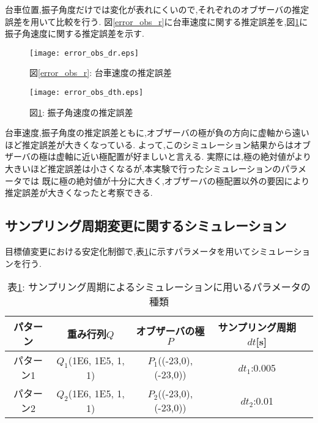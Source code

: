 台車位置,振子角度だけでは変化が表れにくいので,それぞれのオブザーバの推定誤差を用いて比較を行う.
図\ref{error_obs_r}に台車速度に関する推定誤差を,図\ref{error_obs_th}に振子角速度に関する推定誤差を示す.

\begin{figure}[htbp]
    \begin{minipage}{0.5\hsize}
        \begin{center}
            \texttt{[image: error\_obs\_dr.eps]}
            \caption{図\ref{error_obs_r}: 台車速度の推定誤差}
            \label{error_obs_r}
        \end{center}
    \end{minipage}
    \begin{minipage}{0.5\hsize}
        \begin{center}
            \texttt{[image: error\_obs\_dth.eps]}
            \caption{図\ref{error_obs_th}: 振子角速度の推定誤差}
            \label{error_obs_th}
        \end{center}
    \end{minipage}
\end{figure}

台車速度,振子角度の推定誤差ともに,オブザーバの極が負の方向に虚軸から遠いほど推定誤差が大きくなっている.
よって,このシミュレーション結果からはオブザーバの極は虚軸に近い極配置が好ましいと言える.
実際には,極の絶対値がより大きいほど推定誤差は小さくなるが,本実験で行ったシミュレーションのパラメータでは
既に極の絶対値が十分に大きく,オブザーバの極配置以外の要因により推定誤差が大きくなったと考察できる.


\subsection{サンプリング周期変更に関するシミュレーション}
目標値変更における安定化制御で,表\ref{sim_Dt}に示すパラメータを用いてシミュレーションを行う.

\begin{table}[htbp]
    \begin{center}
        \caption{表\ref{sim_Dt}: サンプリング周期によるシミュレーションに用いるパラメータの種類}
        \begin{tabular}{|c|c|c|c|c|} \hline
            パターン & 重み行列$Q$ & オブザーバの極$P$ & サンプリング周期$dt$[s] \\ \hline \hline
            パターン1 & $Q_1$(1E6, 1E5, 1, 1) & $P_1$((-23,0), (-23,0)) & $dt_1$:0.005 \\ \hline
            パターン2 & $Q_2$(1E6, 1E5, 1, 1) & $P_2$((-23,0), (-23,0)) & $dt_2$:0.01 \\ \hline
        \end{tabular}
        \label{sim_Dt}
    \end{center}
\end{table}

